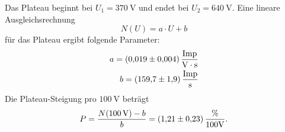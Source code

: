 Das Plateau beginnt bei $U_1 = \SI{370}{\volt}$ und endet bei $U_2 = \SI{640}{\volt}$.
Eine lineare Ausgleichsrechnung
\begin{equation}
    N(U) = a \cdot U + b
\end{equation}
für das Plateau ergibt folgende Parameter:
\begin{align*}
    a = \SI{0.019(4)}{\frac{Imp}{\volt \cdot \second}} \\
    b = \SI{159.7(19)}{\frac{Imp}{s}}
\end{align*}
Die Plateau-Steigung pro $\SI{100}{\volt}$ beträgt
\begin{equation}
    P = \frac{N(\SI{100}{\volt}) - b}{b} = \SI{1.21(23)}{\frac{\percent}{100 \volt}} .
    \label{eqn:plateau_steigung}
\end{equation}
\FloatBarrier

